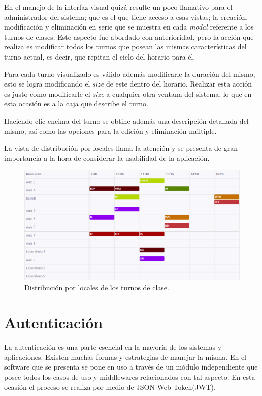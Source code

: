 En el manejo de la interfaz visual quizá resulte un poco llamativo para el administrador del sistema; que es el que tiene acceso a esas vistas; la creación, modificación y eliminación en serie que se muestra en cada \textit{modal} referente a los turnos de clases.  Este aspecto fue abordado con anterioridad, pero la acción que realiza es modificar todos los turnos que posean las mismas características del turno actual, es decir, que repitan el ciclo del horario para él.

Para cada turno visualizado es válido además modificarle la duración del mismo, esto se logra modificando el \textit{size} de este dentro del horario. Realizar esta acción es justo como modificarle el \textit{size} a cualquier otra ventana del sistema, lo que en esta ocasión es a la caja que describe el turno.

Haciendo clic encima del turno se obtine además una descripción detallada del mismo, así como las opciones para la edición y eliminación múltiple.

La vista de distribución por locales llama la atención y se presenta de gran importancia a la hora de considerar la usabilidad de la aplicación.

\begin{figure}[h!]
	\centering
	\includegraphics[width=0.95\linewidth]{images/Chapter 3/resource_distribution}
	\caption{Distribución por locales de los turnos de clase.}
	\label{fig:resource_distributions}
\end{figure}

\section{Autenticación}

La autenticación es una parte esencial en la mayoría de los sistemas y aplicaciones. Existen muchas formas y estrategias de manejar la misma. En el software que se presenta se pone en uso a través de un módulo independiente que posee todos los casos de uso y middlewares relacionados con tal aspecto. En esta ocasión el proceso se realiza por medio de JSON Web Token(JWT).

